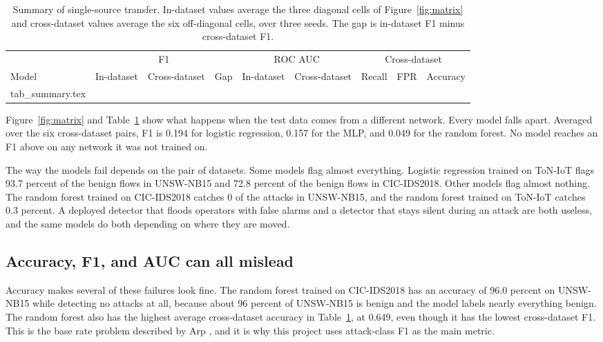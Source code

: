 \begin{table}[t]
\centering
\small
\begin{tabular}{lcccccccc}
\toprule
& \multicolumn{3}{c}{F1} & \multicolumn{2}{c}{ROC AUC} & \multicolumn{3}{c}{Cross-dataset} \\
\cmidrule(lr){2-4}\cmidrule(lr){5-6}\cmidrule(lr){7-9}
Model & In-dataset & Cross-dataset & Gap & In-dataset & Cross-dataset & Recall & FPR & Accuracy \\
\midrule
{} tab_summary.tex 
\bottomrule
\end{tabular}
\caption{Summary of single-source transfer. In-dataset values average the three diagonal cells of Figure~\ref{fig:matrix} and cross-dataset values average the six off-diagonal cells, over three seeds. The gap is in-dataset F1 minus cross-dataset F1.}
\label{tab:summary}
\end{table}

Figure~\ref{fig:matrix} and Table~\ref{tab:summary} show what happens when the test data comes from a different network. Every model falls apart. Averaged over the six cross-dataset pairs, F1 is 0.194 for logistic regression, 0.157 for the MLP, and 0.049 for the random forest. \ATTNCROSS{} No model reaches an F1 above \CROSSMAX{} on any network it was not trained on.

The way the models fail depends on the pair of datasets. Some models flag almost everything. Logistic regression trained on ToN-IoT flags 93.7 percent of the benign flows in UNSW-NB15 and 72.8 percent of the benign flows in CIC-IDS2018. Other models flag almost nothing. The random forest trained on CIC-IDS2018 catches 0 of the attacks in UNSW-NB15, and the random forest trained on ToN-IoT catches 0.3 percent. A deployed detector that floods operators with false alarms and a detector that stays silent during an attack are both useless, and the same models do both depending on where they are moved.

\subsection{Accuracy, F1, and AUC can all mislead}

\FLAGPARA

Accuracy makes several of these failures look fine. The random forest trained on CIC-IDS2018 has an accuracy of 96.0 percent on UNSW-NB15 while detecting no attacks at all, because about 96 percent of UNSW-NB15 is benign and the model labels nearly everything benign. The random forest also has the highest average cross-dataset accuracy in Table~\ref{tab:summary}, at 0.649, even though it has the lowest cross-dataset F1. This is the base rate problem described by Arp \etal \cite{arp2022}, and it is why this project uses attack-class F1 as the main metric.

